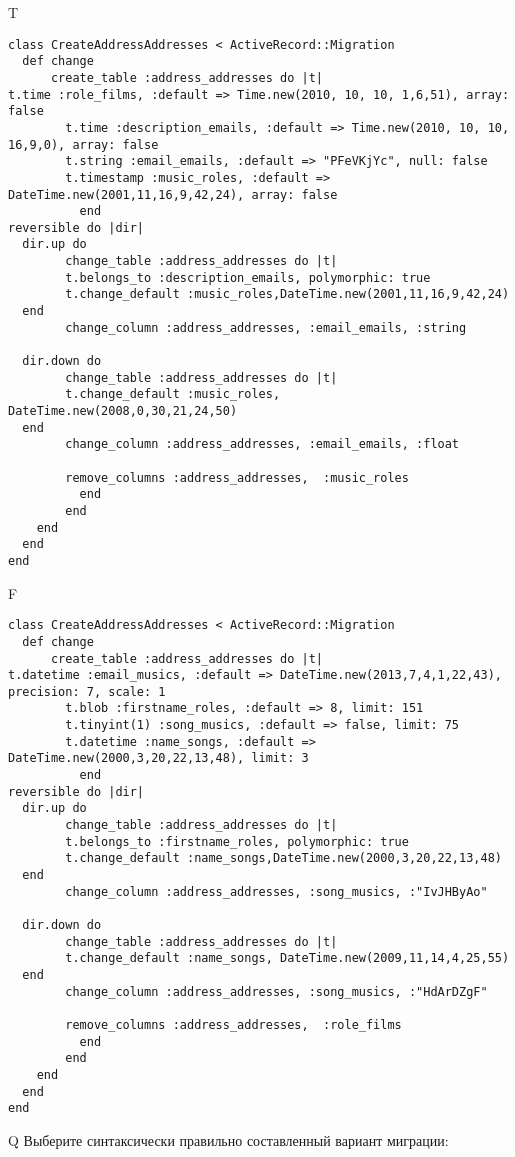 T
\begin{verbatim}
class CreateAddressAddresses < ActiveRecord::Migration
  def change
	  create_table :address_addresses do |t|
t.time :role_films, :default => Time.new(2010, 10, 10, 1,6,51), array: false
		t.time :description_emails, :default => Time.new(2010, 10, 10, 16,9,0), array: false
		t.string :email_emails, :default => "PFeVKjYc", null: false
		t.timestamp :music_roles, :default => DateTime.new(2001,11,16,9,42,24), array: false
		  end
reversible do |dir|
  dir.up do
		change_table :address_addresses do |t|
		t.belongs_to :description_emails, polymorphic: true
 		t.change_default :music_roles,DateTime.new(2001,11,16,9,42,24)
  end
 		change_column :address_addresses, :email_emails, :string
   
  dir.down do
		change_table :address_addresses do |t|
		t.change_default :music_roles, DateTime.new(2008,0,30,21,24,50)
  end
 		change_column :address_addresses, :email_emails, :float
   
		remove_columns :address_addresses,  :music_roles 
	      end
	    end
    end 
  end
end

\end{verbatim}

F
\begin{verbatim}
class CreateAddressAddresses < ActiveRecord::Migration
  def change
	  create_table :address_addresses do |t|
t.datetime :email_musics, :default => DateTime.new(2013,7,4,1,22,43), precision: 7, scale: 1
		t.blob :firstname_roles, :default => 8, limit: 151
		t.tinyint(1) :song_musics, :default => false, limit: 75
		t.datetime :name_songs, :default => DateTime.new(2000,3,20,22,13,48), limit: 3
		  end
reversible do |dir|
  dir.up do
		change_table :address_addresses do |t|
		t.belongs_to :firstname_roles, polymorphic: true
 		t.change_default :name_songs,DateTime.new(2000,3,20,22,13,48)
  end
 		change_column :address_addresses, :song_musics, :"IvJHByAo"
   
  dir.down do
		change_table :address_addresses do |t|
		t.change_default :name_songs, DateTime.new(2009,11,14,4,25,55)
  end
 		change_column :address_addresses, :song_musics, :"HdArDZgF"
   
		remove_columns :address_addresses,  :role_films 
	      end
	    end
    end 
  end
end

\end{verbatim}

Q
Выберите синтаксически правильно составленный вариант миграции:

